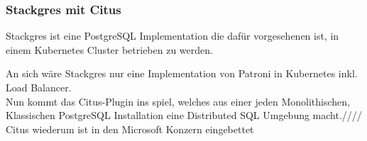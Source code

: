 \subsubsection{Stackgres mit Citus}
\begin{flushleft} 
Stackgres ist eine PostgreSQL Implementation die dafür vorgesehenen ist, in einem Kubernetes Cluster betrieben zu werden.
\end{flushleft} 
\begin{flushleft}
An sich wäre Stackgres nur eine Implementation von Patroni in Kubernetes inkl. Load Balancer.\\
Nun kommt das Citus-Plugin ins spiel, welches aus einer jeden Monolithischen, Klassischen PostgreSQL Installation eine Distributed SQL Umgebung macht.////
Citus wiederum ist in den Microsoft Konzern eingebettet
\end{flushleft}

